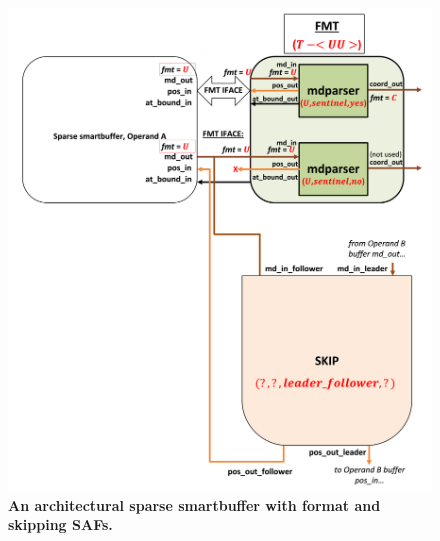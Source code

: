\begin{figure}[H]
\includegraphics[width=\textwidth]{figures/safinference_build_07buffportfmt.png}
\caption{\textbf{An architectural sparse smartbuffer with format and skipping SAFs.}}
\label{fig:safinference_build_07buffportfmt}
\centering
\end{figure}



